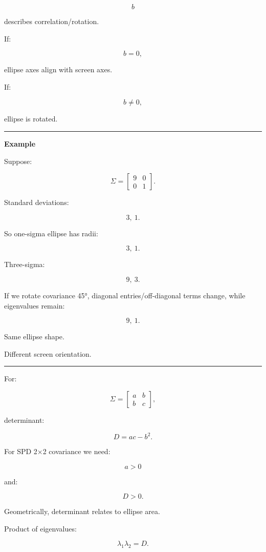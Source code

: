 \[
b
\]

describes correlation/rotation.

If:

\[
b=0,
\]

ellipse axes align with screen axes.

If:

\[
b\ne0,
\]

ellipse is rotated.

\begin{center}\rule{0.5\linewidth}{0.5pt}\end{center}

\textbf{Example}

Suppose:

\[
\Sigma=
\begin{bmatrix}
9&0\\
0&1
\end{bmatrix}.
\]

Standard deviations:

\[
3,\ 1.
\]

So one-sigma ellipse has radii:

\[
3,\ 1.
\]

Three-sigma:

\[
9,\ 3.
\]

If we rotate covariance 45°, diagonal entries/off-diagonal terms change, while eigenvalues remain:

\[
9,\ 1.
\]

Same ellipse shape.

Different screen orientation.

\begin{center}\rule{0.5\linewidth}{0.5pt}\end{center}

For:

\[
\Sigma=
\begin{bmatrix}
a&b\\
b&c
\end{bmatrix},
\]

determinant:

\[
\boxed{
D=ac-b^2.
}
\]

For SPD 2×2 covariance we need:

\[
a>0
\]

and:

\[
D>0.
\]

Geometrically, determinant relates to ellipse area.

Product of eigenvalues:

\[
\lambda_1\lambda_2=D.
\]

